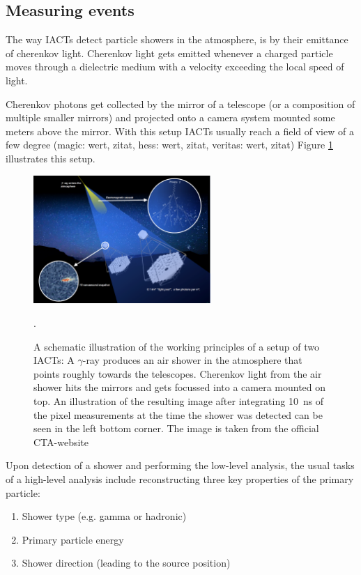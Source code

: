 \subsection{Measuring events}
\label{sec:measuring}

The way IACTs detect particle showers in the atmosphere, is by their emittance 
of cherenkov light. Cherenkov light gets emitted whenever a 
charged particle moves through a dielectric medium with a velocity 
exceeding the local speed of light.

Cherenkov photons get collected by the mirror of a telescope (or a composition of 
multiple smaller mirrors) and projected onto a camera system mounted some 
meters above the mirror.
With this setup IACTs usually reach a field of view of 
a few degree (magic: wert, zitat, hess: wert, zitat, veritas: wert, zitat)
Figure \ref{fig:iact_mirror_camera} illustrates this 
setup.


\begin{figure}
	\centering
	\includegraphics[width=0.6\textwidth]{images/cta47.png}
	\caption{A schematic illustration of the working principles of 
	a setup of two IACTs:
	A $\gamma$-ray produces an air shower in the atmosphere
	that points roughly towards the telescopes.
	Cherenkov light from the air shower 
	hits the mirrors and gets focussed into a camera mounted on top.
	An illustration of the resulting image after integrating 
	\SI{10}{\nano\second} of the pixel measurements at the time the shower 
	was detected
	can be seen in the left bottom corner.
	The image is taken from the official CTA-website \cite{cta_web}}.
	\label{fig:iact_mirror_camera}
\end{figure}


Upon detection of a shower and performing the low-level analysis,
the usual tasks of a high-level analysis include reconstructing 
three key properties of the primary particle:
\begin{enumerate}
	\item{Shower type (e.g. gamma or hadronic)}
	\item{Primary particle energy}
	\item{Shower direction (leading to the source position)}
\end{enumerate}

